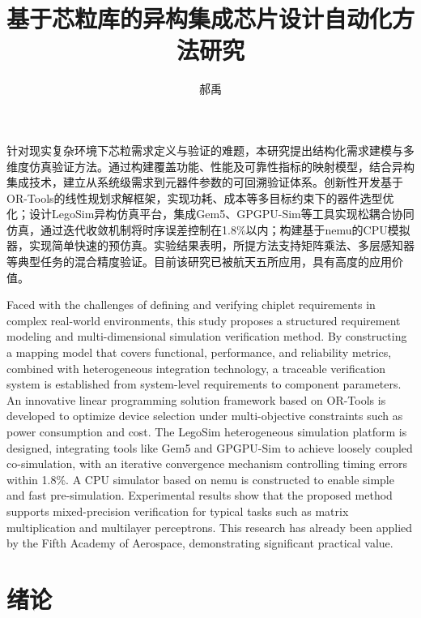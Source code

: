 \documentclass[bachelor]{thesis-uestc}
\title{基于芯粒库的异构集成芯片设计自动化方法研究}{The Time Marching Scheme of Time Domain
    Integral Equation and Corresponding Fast Algorithm}
\author{郝禹}{Wang Wen}
\begin{document}
\makecover

\begin{chineseabstract}
针对现实复杂环境下芯粒需求定义与验证的难题，本研究提出结构化需求建模与多维度仿真验证方法。通过构建覆盖功能、性能及可靠性指标的映射模型，结合异构集成技术，建立从系统级需求到元器件参数的可回溯验证体系。创新性开发基于OR-Tools的线性规划求解框架，实现功耗、成本等多目标约束下的器件选型优化；设计LegoSim异构仿真平台，集成Gem5、GPGPU-Sim等工具实现松耦合协同仿真，通过迭代收敛机制将时序误差控制在1.8\%以内；构建基于nemu的CPU模拟器，实现简单快速的预仿真。实验结果表明，所提方法支持矩阵乘法、多层感知器等典型任务的混合精度验证。目前该研究已被航天五所应用，具有高度的应用价值。



\end{chineseabstract}

\begin{englishabstract}
    Faced with the challenges of defining and verifying chiplet requirements in complex real-world environments, this study proposes a structured requirement modeling and multi-dimensional simulation verification method. By constructing a mapping model that covers functional, performance, and reliability metrics, combined with heterogeneous integration technology, a traceable verification system is established from system-level requirements to component parameters. An innovative linear programming solution framework based on OR-Tools is developed to optimize device selection under multi-objective constraints such as power consumption and cost. The LegoSim heterogeneous simulation platform is designed, integrating tools like Gem5 and GPGPU-Sim to achieve loosely coupled co-simulation, with an iterative convergence mechanism controlling timing errors within 1.8\%. A CPU simulator based on nemu is constructed to enable simple and fast pre-simulation. Experimental results show that the proposed method supports mixed-precision verification for typical tasks such as matrix multiplication and multilayer perceptrons. This research has already been applied by the Fifth Academy of Aerospace, demonstrating significant practical value.

\end{englishabstract}

\thesistableofcontents

\chapter{绪\hspace{6pt}论}
\end{document}
